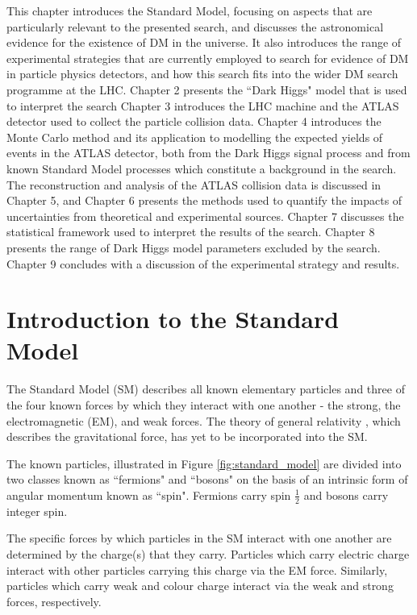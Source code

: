 This chapter introduces the Standard Model, focusing on aspects that are particularly relevant to the presented search, and discusses the astronomical evidence for the existence of DM in the universe. It also introduces the range of experimental strategies that are currently employed to search for evidence of DM in particle physics detectors, and how this search fits into the wider DM search programme at the LHC. Chapter 2 presents the ``Dark Higgs" model that is used to interpret the search
Chapter 3 introduces the LHC machine and the ATLAS detector used to collect the particle collision data. Chapter 4 introduces the Monte Carlo method and its application to modelling the expected yields of events in the ATLAS detector, both from the Dark Higgs signal process and from known Standard Model processes which constitute a background in the search. The reconstruction and analysis of the ATLAS collision data is discussed in Chapter 5, and Chapter 6 presents the methods used to quantify the impacts of uncertainties from theoretical and experimental sources. Chapter 7 discusses the statistical framework used to interpret the results of the search. Chapter 8 presents the range of Dark Higgs model parameters excluded by the search. Chapter 9 concludes with a discussion of the experimental strategy and results. 

\section{Introduction to the Standard Model}

The Standard Model (SM) describes all known elementary particles and three of the four known forces by which they interact with one another - the strong, the electromagnetic (EM), and weak forces. The theory of general relativity \cite{einstein_1920}, which describes the gravitational force, has yet to be incorporated into the SM. 

The known particles, illustrated in Figure \ref{fig:standard_model} are divided into two classes known as ``fermions" and ``bosons" on the basis of an intrinsic form of angular momentum known as ``spin". Fermions carry spin \(\frac{1}{2}\) and bosons carry integer spin. 

The specific forces by which particles in the SM interact with one another are determined by the charge(s) that they carry. Particles which carry electric charge interact with other particles carrying this charge via the EM force. Similarly, particles which carry weak and colour charge interact via the weak and strong forces, respectively. 

